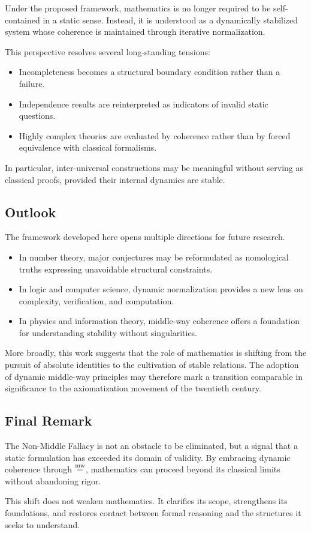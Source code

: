 \documentclass[11pt]{article}
\begin{document}
Under the proposed framework, mathematics is no longer required to be
self-contained in a static sense.
Instead, it is understood as a dynamically stabilized system whose
coherence is maintained through iterative normalization.

This perspective resolves several long-standing tensions:

\begin{itemize}
 \item Incompleteness becomes a structural boundary condition rather
 than a failure.
 \item Independence results are reinterpreted as indicators of invalid
 static questions.
 \item Highly complex theories are evaluated by coherence rather than
 by forced equivalence with classical formalisms.
\end{itemize}

In particular, inter-universal constructions may be meaningful without
serving as classical proofs, provided their internal dynamics are
stable.

\subsection{Outlook}

The framework developed here opens multiple directions for future
research.

\begin{itemize}
 \item In number theory, major conjectures may be reformulated as
 nomological truths expressing unavoidable structural constraints.
 \item In logic and computer science, dynamic normalization provides a
 new lens on complexity, verification, and computation.
 \item In physics and information theory, middle-way coherence offers
 a foundation for understanding stability without singularities.
\end{itemize}

More broadly, this work suggests that the role of mathematics is
shifting from the pursuit of absolute identities to the cultivation of
stable relations.
The adoption of dynamic middle-way principles may therefore mark a
transition comparable in significance to the axiomatization movement
of the twentieth century.

\subsection{Final Remark}

The Non-Middle Fallacy is not an obstacle to be eliminated, but a signal
that a static formulation has exceeded its domain of validity.
By embracing dynamic coherence through $\mathrel{\overset{\mathrm{mw}}{=}}$, mathematics can proceed
beyond its classical limits without abandoning rigor.

This shift does not weaken mathematics.
It clarifies its scope, strengthens its foundations, and restores
contact between formal reasoning and the structures it seeks to
understand.
\end{document}
